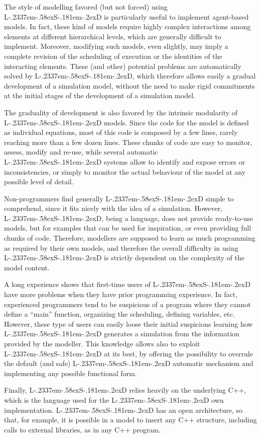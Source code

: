 \documentclass [11pt,a4paper] {book}
\def\LsD{{L\kern-.2337em\lower-.58ex\hbox{S}\kern-.181em\lower-.2ex\hbox{D}}\xspace}
\begin{document}
The style of modelling favored (but not forced) using \LsD is particularly useful to implement agent-based models. In fact, these kind of models require highly complex interactions among elements at different hierarchical levels, which are generally difficult to implement. Moreover, modifying such models, even slightly, may imply a complete revision of the scheduling of execution or the identities of the interacting elements. These (and other) potential problems are automatically solved by \LsD, which therefore allows easily a gradual development of a simulation model, without the need to make rigid commitments at the initial stages of the development of a simulation model.

The graduality of development is also favored by the intrinsic modularity of \LsD models. Since the code for the model is defined as individual equations, most of this code is composed by a few lines, rarely reaching more than a few dozen lines. These chunks of code are easy to monitor, assess, modify and re-use, while several automatic \LsD systems allow to identify and expose errors or inconsistencies, or simply to monitor the actual behaviour of the model at any possible level of detail.

Non-programmers find generally \LsD simple to comprehend, since it fits nicely with the idea of a simulation. However, \LsD, being a language, does not provide ready-to-use models, but for examples that can be used for inspiration, or even providing full chunks of code. Therefore, modellers are supposed to learn as much programming as required by their own models, and therefore the overall difficulty in using \LsD is strictly dependent on the complexity of the model content.

A long experience shows that first-time users of \LsD have more problems when they have prior programming experience. In fact, experienced programmers tend to be suspicious of a program where they cannot define a ``main'' function, organizing the scheduling, defining variables, etc. However, these type of users can easily loose their initial suspicions learning how \LsD generates a simulation from the information provided by the modeller. This knowledge allows also to exploit \LsD at its best, by offering the possibility to overrule the default (and safe) \LsD automatic mechanism and implementing any possible functional form.

Finally, \LsD relies heavily on the underlying C++, which is the language used for the \LsD own implementation. \LsD has an open architecture, so that, for example, it is possible in a model to insert any C++ structure, including calls to external libraries, as in any C++ program.
\end{document}
